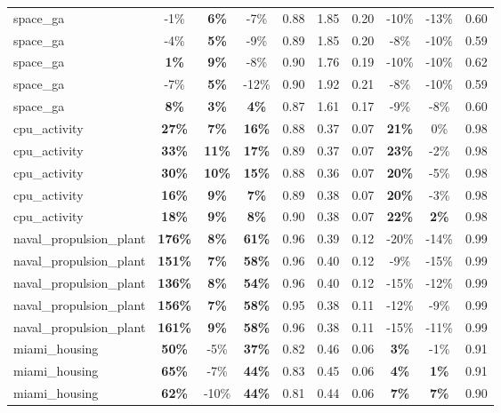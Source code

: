 \begin{table}[!htbp]
\begin{small}
\begin{sc}
{\begin{tabular}{lccccccccc}
space\_ga & -1\% & \textbf{6\%} & -7\% & 0.88 & 1.85 & 0.20 & -10\% & -13\% & 0.60 \\
space\_ga & -4\% & \textbf{5\%} & -9\% & 0.89 & 1.85 & 0.20 & -8\% & -10\% & 0.59 \\
space\_ga & \textbf{1\%} & \textbf{9\%} & -8\% & 0.90 & 1.76 & 0.19 & -10\% & -10\% & 0.62 \\
space\_ga & -7\% & \textbf{5\%} & -12\% & 0.90 & 1.92 & 0.21 & -8\% & -10\% & 0.59 \\
space\_ga & \textbf{8\%} & \textbf{3\%} & \textbf{4\%} & 0.87 & 1.61 & 0.17 & -9\% & -8\% & 0.60 \\
cpu\_activity & \textbf{27\%} & \textbf{7\%} & \textbf{16\%} & 0.88 & 0.37 & 0.07 & \textbf{21\%} & 0\% & 0.98 \\
cpu\_activity & \textbf{33\%} & \textbf{11\%} & \textbf{17\%} & 0.89 & 0.37 & 0.07 & \textbf{23\%} & -2\% & 0.98 \\
cpu\_activity & \textbf{30\%} & \textbf{10\%} & \textbf{15\%} & 0.88 & 0.36 & 0.07 & \textbf{20\%} & -5\% & 0.98 \\
cpu\_activity & \textbf{16\%} & \textbf{9\%} & \textbf{7\%} & 0.89 & 0.38 & 0.07 & \textbf{20\%} & -3\% & 0.98 \\
cpu\_activity & \textbf{18\%} & \textbf{9\%} & \textbf{8\%} & 0.90 & 0.38 & 0.07 & \textbf{22\%} & \textbf{2\%} & 0.98 \\
naval\_propulsion\_plant & \textbf{176\%} & \textbf{8\%} & \textbf{61\%} & 0.96 & 0.39 & 0.12 & -20\% & -14\% & 0.99 \\
naval\_propulsion\_plant & \textbf{151\%} & \textbf{7\%} & \textbf{58\%} & 0.96 & 0.40 & 0.12 & -9\% & -15\% & 0.99 \\
naval\_propulsion\_plant & \textbf{136\%} & \textbf{8\%} & \textbf{54\%} & 0.96 & 0.40 & 0.12 & -15\% & -12\% & 0.99 \\
naval\_propulsion\_plant & \textbf{156\%} & \textbf{7\%} & \textbf{58\%} & 0.95 & 0.38 & 0.11 & -12\% & -9\% & 0.99 \\
naval\_propulsion\_plant & \textbf{161\%} & \textbf{9\%} & \textbf{58\%} & 0.96 & 0.38 & 0.11 & -15\% & -11\% & 0.99 \\
miami\_housing & \textbf{50\%} & -5\% & \textbf{37\%} & 0.82 & 0.46 & 0.06 & \textbf{3\%} & -1\% & 0.91 \\
miami\_housing & \textbf{65\%} & -7\% & \textbf{44\%} & 0.83 & 0.45 & 0.06 & \textbf{4\%} & \textbf{1\%} & 0.91 \\
miami\_housing & \textbf{62\%} & -10\% & \textbf{44\%} & 0.81 & 0.44 & 0.06 & \textbf{7\%} & \textbf{7\%} & 0.90 \\

\end{tabular}}
\end{sc}
\end{small}
\end{table}
